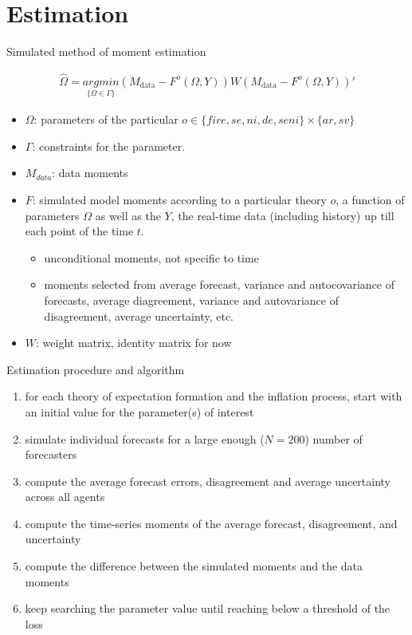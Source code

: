 \documentclass{beamer}
\begin{document}
\section{Estimation}
\begin{frame}{Simulated method of moment estimation}
	
	\begin{eqnarray*}
	\widehat \Omega = \underset{\{\Omega \in \Gamma\} }{argmin} (M_{\textrm{data} } - F^{o}(\Omega, Y)) W  (M_{\textrm{data} } - F^{o}(\Omega, Y))'
	\end{eqnarray*}
	
	\begin{itemize}
		\item  $\Omega$: parameters of the particular $o \in \{{fire}, {se}, {ni},{de},{seni} \} \times \{ar, sv\}$
		\item  $\Gamma$: constraints for the parameter. 
		\item $M_{data}$: data moments
		\item $F$: simulated model moments according to a particular theory $o$, a function of parameters $\Omega$ as well as the $Y$, the real-time data (including history) up till each point of the time $t$. 
		\begin{itemize}
			\item unconditional moments, not specific to time
			\item moments selected from average forecast, variance and autocovariance of forecasts, average diagreement, variance and autovariance of disagreement, average uncertainty, etc. 
		\end{itemize}
		\item  $W$: weight matrix, identity matrix for now 
	\end{itemize}
\end{frame}


\begin{frame}{Estimation procedure and algorithm}
	\begin{enumerate}
		\item for each theory of expectation formation and the inflation process, start with an initial value for the parameter(s) of interest
		\item simulate individual forecasts for a large enough ($N=200$) number of forecasters
		\item compute the average forecast errors, disagreement and average uncertainty across all agents
		\item compute the time-series moments of the average forecast, disagreement, and uncertainty
		\item compute the difference between the simulated moments and the data moments 
		\item keep searching the parameter value until reaching below a threshold of the loss
	\end{enumerate}
\end{frame}
\end{document}
